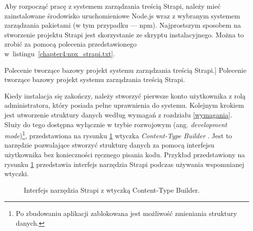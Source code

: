\documentclass[12pt]{article}
\numberwithin{figure}{section}
\begin{document}
\begin{sloppypar}
Aby rozpocząć pracę z systemem zarządzania treścią Strapi, należy mieć zainstalowane środowisko uruchomieniowe Node.js wraz z wybranym systemem zarządzania pakietami (w tym przypadku --- npm). Najprostszym sposobem na stworzenie projektu Strapi jest skorzystanie ze skryptu instalacyjnego. Można to zrobić za pomocą polecenia przedstawionego w~listingu~\ref{chapter4:npx_strapi.txt}. 

\begin{code}[htbp]
    
    \caption
    [Polecenie tworzące bazowy projekt systemu zarządzania treścią Strapi.]
    {Polecenie tworzące bazowy projekt systemu zarządzania treścią Strapi.}
    \label{chapter4:npx_strapi.txt}
\end{code}


Kiedy instalacja się zakończy, należy stworzyć pierwsze konto użytkownika z rolą administratora, który posiada pełne uprawnienia do systemu. Kolejnym krokiem jest utworzenie struktury danych według wymagań z rozdziału \ref{wymagania}. Służy do tego dostępna wyłącznie w trybie rozwojowym (ang. \textit{development mode})\footnote{Po zbudowaniu aplikacji zablokowana jest możliwość zmieniania struktury danych.}, przedstawiona na rysunku \ref{fig:strapi-interface-1.jpg} wtyczka \textit{Content-Type Builder} \cite{strapidocs}. Jest to narzędzie pozwalające stworzyć strukturę danych za pomocą interfejsu użytkownika bez konieczności ręcznego pisania kodu. Przykład przedstawiony na rysunku \ref{fig:strapi-interface-1.jpg} przedstawia interfejs narzędzia Strapi podczas używania wspomnianej wtyczki. 

\begin{figure}[H] 
    \centering
   \caption{Interfejs narzędzia Strapi z wtyczką Content-Type Builder.}
   \label{fig:strapi-interface-1.jpg}
\end{figure}


\end{sloppypar}
\end{document}
